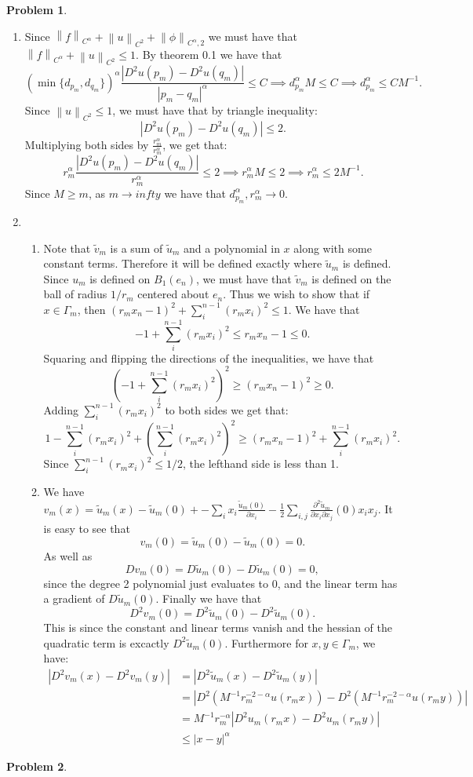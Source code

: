 \documentclass[12pt, a4paper]{article}
\newtheorem{problem}{Problem}
\theoremstyle{definition}
\newcommand{\penum}{ \begin{enumerate}[label=\bf(\alph*), leftmargin=0pt]}
\newcommand{\epenum}{ \end{enumerate} }
\newcommand{\norm}[1]{\left\lVert#1\right\rVert}
\begin{document}
\newpage
\begin{problem}
\end{problem}
\penum
\item Since $\norm{f}_{C^\alpha} + \norm{u}_{C^2} + \norm{\phi}_{C^\alpha,2}$ we must have that $\norm{f}_{C^\alpha} + \norm{u}_{C^2} \leq 1$. By theorem 0.1 we have that 
	$$\left( \min \{d_{p_m} ,d_{q_m} \}\right)^\alpha \frac{|D^2u(p_m) - D^2u(q_m)| }{|p_m-q_m|^\alpha} \leq C \implies d_{p_m}^\alpha M \leq C \implies d_{p_m}^\alpha \leq CM^{-1}.$$
Since $\norm{u}_{C^2} \leq 1$, we must have that by triangle inequality:
$$|D^2u(p_m) - D^2u(q_m)|\leq 2.$$
Multiplying both sides by $\frac{r_m^\alpha}{r_m^\alpha}$, we get that:
$$r^\alpha_m \frac{|D^2u(p_m) - D^2u(q_m)|}{r_m^\alpha}\leq 2 \implies r_m^\alpha M \leq 2 \implies r_m^\alpha \leq 2M^{-1}.$$
Since $M \geq m$, as $m \to infty$ we have that $d_{p_m}^\alpha, r_m^\alpha \to 0$. 
\item 
\begin{enumerate}[label = \roman*) ]
	\item Note that $\tilde{v}_m$ is a sum of $\tilde{u}_m$ and a polynomial in $x$ along with some constant terms. Therefore it will be defined exactly where $\tilde{u}_m$ is defined. Since $u_m$ is defined on $B_1(e_n)$, we must have that $\tilde{v}_m$ is defined on the ball of radius $1/r_m$ centered about $e_n$. Thus we wish to show that if $x\in \Gamma_m$, then $(r_mx_n - 1)^2 + \sum_{i}^{n-1}(r_mx_i)^2 \leq 1$. 
We have that 
		$$-1 + \sum_{i}^{n-1} (r_mx_i)^2 \leq r_mx_n - 1 \leq 0.$$
Squaring and flipping the directions of the inequalities, we have that 
$$ \left(-1 + \sum_{i}^{n-1} (r_mx_i)^2  \right)^2 \geq (r_m x_n- 1)^2 \geq 0. $$
Adding $\sum_{i}^{n-1} (r_m x_i)^2$ to both sides we get that:
		$$1 - \sum_{i}^{n-1} (r_mx_i)^2  + \left(\sum_{i}^{n-1} (r_mx_i)^2 \right)^2 \geq (r_mx_n-1)^2 + \sum_{i}^{n-1}(r_mx_i)^2.$$
Since $\sum_{i}^{n-1} (r_mx_i)^2 \leq 1/2$, the lefthand side is less than 1. 
\item We have $v_m(x) =  \tilde{u}_m(x) - \tilde{u}_m(0) + - \sum_i x_i \frac{\tilde{u}_m(0)}{\partial x_i}  - \frac{1}{2} \sum_{i,j} \frac{\partial^2\tilde{u}_m}{\partial x_i \partial x_j}(0) x_ix_j.$
It is easy to see that 
$$v_m(0) = \tilde{u}_m(0) - \tilde{u}_m(0) = 0.$$
As well as
$$Dv_m(0) = D\tilde{u}_m(0) - D\tilde{u}_m(0) =0 ,$$
since the degree 2 polynomial just evaluates to $0$, and the linear term has a gradient of $D\tilde{u}_m(0)$.  
Finally we have that 
$$D^2 v_m(0) = D^2\tilde{u}_m(0) - D^2 \tilde{u}_m(0). $$
This is since the constant and linear terms vanish and the hessian of the quadratic term is excactly $D^2\tilde{u}_m(0)$. Furthermore for $x,y\in \Gamma_m$, we have:
\begin{align*}
 |D^2 v_m(x) - D^2v_m(y)| & = |D^2\tilde{u}_m(x) - D^2\tilde{u}_m(y)|
 \\ & = |D^2(M^{-1}r_m^{-2-\alpha}u(r_m x)) - D^2(M^{-1}r_m^{-2-\alpha}u(r_m y))|
 \\ & = M^{-1}r_m^{-\alpha}|D^2u_m(r_mx) - D^2u_m(r_my)|
 \\ & \leq |x-y|^\alpha \tag{by assumption at points $r_mx,r_my$}
\end{align*}
\end{enumerate}
\epenum
\newpage
\begin{problem}
\end{problem}
\newpage
\end{document}
